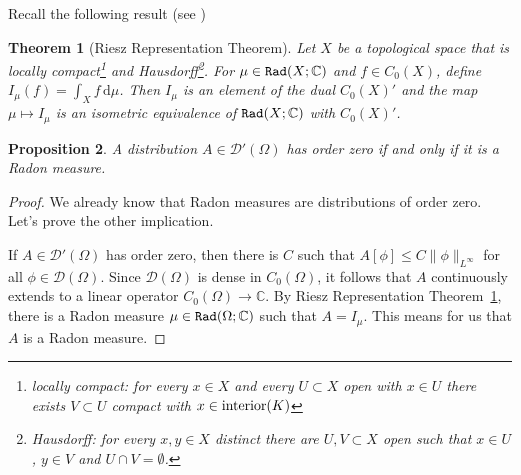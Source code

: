 \documentclass[a4paper,9pt]{amsart}
\newcommand{\scr}[1]{\mathscr{#1}}
\newcommand{\R}{\mathbb{R}}	%
\newcommand{\C}{\mathbb{C}}	%
\newcommand{\did}{\,\mathrm{d}}	%
\theoremstyle{plain}
\newtheorem{proposition}{Proposition}[section]
\newtheorem{theorem}[proposition]{Theorem}
\theoremstyle{definition}
\theoremstyle{remark}
\begin{document}
%
%


Recall the following result (see \cite[Thm 7.17, page 223]{MR767633})
\begin{theorem}[Riesz Representation Theorem]\label{thm67e2d9b5}
	Let $X$ be a topological space that is locally compact\footnote{locally compact: for every $x\in X$ and every $U\subset X$ open with $x\in U$ there exists $V\subset U$ compact with $x\in{\rm interior}(K)$} and Hausdorff\footnote{Hausdorff: for every $x,y\in X$ distinct there are $U,V\subset X$ open such that $x\in U$, $y\in V$ and $U\cap V=\emptyset$.}.
	For $\mu\in\radon(X;\C)$ and $f\in C_0(X)$, define $I_\mu(f) = \int_X f\did\mu$.
	Then $I_\mu$ is an element of the dual $C_0(X)'$ and the map $\mu\mapsto I_\mu$ is an isometric equivalence of $\radon(X;\C)$ with $C_0(X)'$.
\end{theorem}


\begin{proposition}\label{prop6810ed13}
	A distribution $A\in\scr D'(\Omega)$ has order zero if and only if it is a Radon measure.
\end{proposition}
\begin{proof}
	We already know that Radon measures are distributions of order zero.
	Let's prove the other implication.
	
	If $A\in\scr D'(\Omega)$ has order zero, then there is $C$ such that $A[\phi]\le C\|\phi\|_{L^\infty}$ for all $\phi\in \scr D(\Omega)$.
	Since $ \scr D(\Omega)$ is dense in $C_0(\Omega)$, 
	it follows that $A$ continuously extends to a linear operator $C_0(\Omega)\to\C$.
	By Riesz Representation Theorem~\ref{thm67e2d9b5}, there is a Radon measure $\mu\in\radon(\Omega;\C)$ such that $A=I_\mu$.
	This means for us that $A$ is a Radon measure.
\end{proof}
\end{document}
